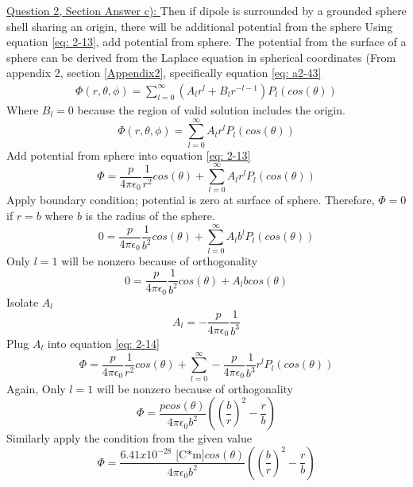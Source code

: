 \documentclass[12pt]{article}
\begin{document}
    
    \underline{Question 2, Section Answer c): }
    Then if dipole is surrounded by a grounded sphere shell sharing an origin, there will be additional potential from the sphere
    \newline Using equation \ref{eq: 2-13}, add potential from sphere. The potential from the surface of a sphere can be derived from the Laplace equation in spherical coordinates (From appendix 2, section \ref{Appendix2}, specifically equation \ref{eq: a2-43}
    \begin{gather*}
        \Phi(r,\theta, \phi) = \sum_{l=0}^\infty (A_l r^l + B_l r^{-l-1}) P_l(cos(\theta))
    \end{gather*}
    Where $B_l=0$ because the region of valid solution includes the origin.
    \begin{equation} \label{eq: eq: 2-13.1}
        \Phi(r,\theta, \phi) = \sum_{l=0}^\infty A_l r^l P_l(cos(\theta))
    \end{equation}
    Add potential from sphere into equation \ref{eq: 2-13}
    \begin{equation} \label{eq: 2-14}
        \Phi = \frac{p}{4 \pi \epsilon_0} \frac{1}{r^2} cos(\theta) + \sum_{l=0}^\infty A_l r^l P_l(cos(\theta))
    \end{equation}
    Apply boundary condition; potential is zero at surface of sphere. Therefore, $\Phi=0$ if $r=b$ where $b$ is the radius of the sphere. 
    \begin{equation} \label{eq: 2-15}
        0 = \frac{p}{4 \pi \epsilon_0} \frac{1}{b^2} cos(\theta) + \sum_{l=0}^\infty A_l b^l P_l(cos(\theta))
    \end{equation}
    Only $l=1$ will be nonzero because of orthogonality
    \begin{equation} \label{eq: 2-16}
        0 = \frac{p}{4 \pi \epsilon_0} \frac{1}{b^2} cos(\theta) + A_l b cos(\theta)
    \end{equation}
    Isolate $A_l$
    \begin{equation} \label{eq: 2-17}
        A_l = -\frac{p}{4 \pi \epsilon_0} \frac{1}{b^3}
    \end{equation}
    Plug $A_l$ into equation \ref{eq: 2-14}
    \begin{equation} \label{eq: 2-18}
        \Phi = \frac{p}{4 \pi \epsilon_0} \frac{1}{r^2} cos(\theta) + \sum_{l=0}^\infty -\frac{p}{4 \pi \epsilon_0} \frac{1}{b^3} r^l P_l(cos(\theta))
    \end{equation}        
    Again, Only $l=1$ will be nonzero because of orthogonality
    \begin{equation} \label{eq: 2-19}
        \Phi = \frac{p cos(\theta)}{4 \pi \epsilon_0 b^2} \left(\left(\frac{b}{r} \right)^2 - \frac{r}{b} \right)
    \end{equation}
    Similarly apply the condition from the given value
    \begin{equation}
        \Phi = \frac{6.41 x 10^{-28} \text{ [C*m]} cos(\theta)}{4 \pi \epsilon_0 b^2} \left(\left(\frac{b}{r} \right)^2 - \frac{r}{b} \right)
    \end{equation}
\end{document}
